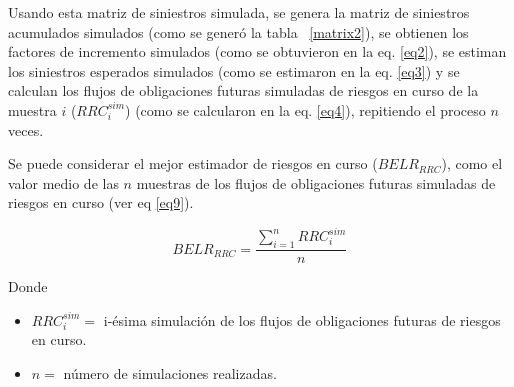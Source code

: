 \documentclass[11pt,twoside,openright,spanish]{report}
\numberwithin{equation}{chapter}
\numberwithin{figure}{chapter}
\numberwithin{table}{chapter}
\begin{document}
Usando esta matriz de siniestros simulada, se genera la matriz de siniestros acumulados simulados (como se generó la tabla ~\ref{matrix2}), se obtienen los factores de incremento simulados (como se obtuvieron en la eq. \ref{eq2}), se estiman los siniestros esperados simulados (como se estimaron en la eq. \ref{eq3}) y se calculan los flujos de obligaciones futuras simuladas de riesgos en curso de la muestra $i$ ($RRC_{i}^{sim}$) (como se calcularon en la eq. \ref{eq4}), repitiendo el proceso $n$ veces.
	
	 
	
	Se puede considerar el mejor estimador de riesgos en curso ($BELR_{RRC}$), como el valor medio de las $n$ muestras de los flujos de obligaciones futuras simuladas de riesgos en curso (ver eq \ref{eq9}).


	 

	
	\begin{equation}
		BELR_{RRC}^{}=\frac{\sum _{i=1}^{n}RRC_{i}^{sim}}{n}
		\label{eq9}
		\end{equation}
			


 
	
	Donde
	
	 
		\begin{itemize}
		\setlength\itemsep{-0.5em}
	\item $RRC_{i}^{sim}=$ i-ésima simulación de los flujos de obligaciones futuras de riesgos en curso.
	
	\item $n=$ número de simulaciones realizadas.
	\end{itemize}
	

	
\end{document}
